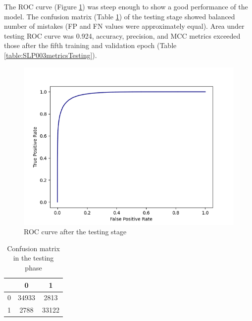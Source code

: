 \documentclass[12pt]{article}
\begin{document}
	The ROC curve (Figure \ref{figure:SLP003testing}) was steep enough to show
	a good performance of the model. The confusion matrix 
	(Table \ref{table:SLP003confusionMatrixTesting}) of the testing stage 
	showed balanced number of mistakes (FP and FN values were approximately 
	equal). Area under testing ROC curve was 0.924, 
	accuracy, precision, and MCC metrics exceeded those after the fifth training 
	and validation epoch (Table \ref{table:SLP003metricsTesting}). 

	\begin{figure}[h!]
		\centering
		\includegraphics[scale=0.7]{testing_0_3068.png}

		\caption{ ROC curve after the testing stage}
		\label{figure:SLP003testing}
	\end{figure}

	\begin{table}[h!]
		\caption{Confusion matrix in the testing phase}
		\vspace{0.2cm}
		\centering
		\begin{tabular}{ | c | c c | }
			\hline 
			& 0 & 1 \\
			\hline  
			0 & 34933 & 2813 \\
			1 & 2788 & 33122 \\
			\hline    
		\end{tabular}
		\label{table:SLP003confusionMatrixTesting}
	\end{table}
\end{document}
